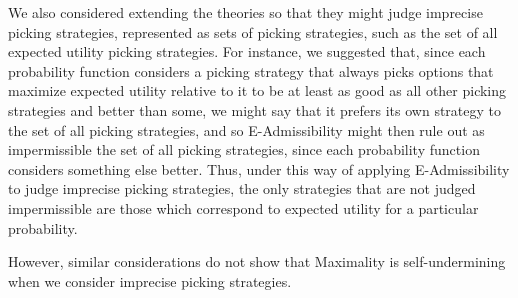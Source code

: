 \documentclass[a4paper]{article}
\newcommand\EU{\mathrm{EU}}
\newcommand{\todoold}[2][]{\todo[backgroundcolor=white,bordercolor=orange!10,linecolor=gray!10, #1,caption={},textcolor=gray]{Pre-rev: #2}}
\newcommand{\todooldinfo}[2][]{\todoold[#1]{#2}}
\newenvironment{CCM rewritten}
{\begingroup\color{blue}} %
{\endgroup}              %
\begin{document}
	We also considered extending the theories so that they might judge imprecise picking strategies, represented as sets of picking strategies, such as the set of all expected utility picking strategies. For instance, we suggested that, since each probability function considers a picking strategy that always picks options that maximize expected utility relative to it to be at least as good as all other picking strategies and better than some, we might say that it prefers its own strategy to the set of all picking strategies, and so E-Admissibility might then rule out as impermissible the set of all picking strategies, since each probability function considers something else better. Thus, under this way of applying E-Admissibility to judge imprecise picking strategies, the only strategies that are not judged impermissible are those which correspond to expected utility for a particular probability. \todooldinfo{ARGH!}

%
However, similar considerations do not show that Maximality is self-undermining when we consider imprecise picking strategies. 
\end{document}
